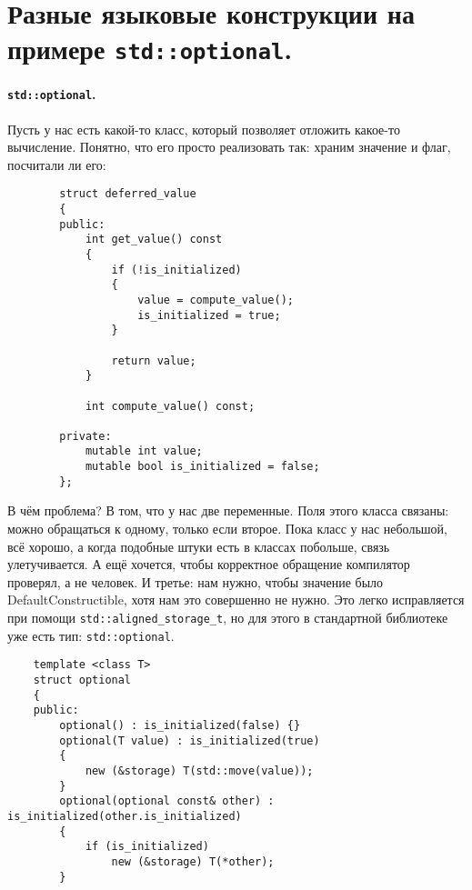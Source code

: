 \documentclass{article}
\begin{document}
    \section{Разные языковые конструкции на примере \texttt{std::optional}.}
    \paragraph{\texttt{std::optional}.}
    Пусть у нас есть какой-то класс, который позволяет отложить какое-то вычисление. Понятно, что его просто реализовать так: храним значение и флаг, посчитали ли его:
    \begin{verbatim}
        struct deferred_value
        {
        public:
            int get_value() const
            {
                if (!is_initialized)
                {
                    value = compute_value();
                    is_initialized = true;
                }

                return value;
            }

            int compute_value() const;

        private:
            mutable int value;
            mutable bool is_initialized = false;
        };
    \end{verbatim}
    В чём проблема? В том, что у нас две переменные. Поля этого класса связаны: можно обращаться к одному, только если второе. Пока класс у нас небольшой, всё хорошо, а когда подобные штуки есть в классах побольше, связь улетучивается. А ещё хочется, чтобы корректное обращение компилятор проверял, а не человек. И третье: нам нужно, чтобы значение было DefaultConstructible, хотя нам это совершенно не нужно. Это легко исправляется при помощи \texttt{std::aligned_storage_t}, но для этого в стандартной библиотеке уже есть тип: \texttt{std::optional}.
    \begin{verbatim}
    template <class T>
    struct optional
    {
    public:
        optional() : is_initialized(false) {}
        optional(T value) : is_initialized(true)
        {
            new (&storage) T(std::move(value));
        }
        optional(optional const& other) : is_initialized(other.is_initialized)
        {
            if (is_initialized)
                new (&storage) T(*other);
        }
    \end{verbatim}
    \pagebreak
\end{document}
